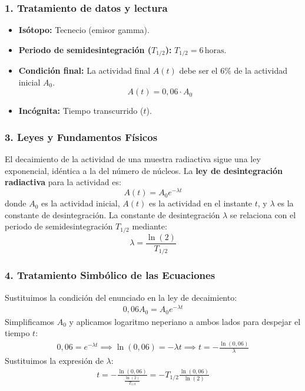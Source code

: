 \subsubsection*{1. Tratamiento de datos y lectura}
\begin{itemize}
    \item \textbf{Isótopo:} Tecnecio (emisor gamma).
    \item \textbf{Periodo de semidesintegración ($T_{1/2}$):} $T_{1/2} = 6\,\text{horas}$.
    \item \textbf{Condición final:} La actividad final $A(t)$ debe ser el 6\% de la actividad inicial $A_0$.
    $$ A(t) = 0,06 \cdot A_0 $$
    \item \textbf{Incógnita:} Tiempo transcurrido ($t$).
\end{itemize}

\subsubsection*{3. Leyes y Fundamentos Físicos}
El decaimiento de la actividad de una muestra radiactiva sigue una ley exponencial, idéntica a la del número de núcleos.
La \textbf{ley de desintegración radiactiva} para la actividad es:
$$ A(t) = A_0 e^{-\lambda t} $$
donde $A_0$ es la actividad inicial, $A(t)$ es la actividad en el instante $t$, y $\lambda$ es la constante de desintegración.
La constante de desintegración $\lambda$ se relaciona con el periodo de semidesintegración $T_{1/2}$ mediante:
$$ \lambda = \frac{\ln(2)}{T_{1/2}} $$

\subsubsection*{4. Tratamiento Simbólico de las Ecuaciones}
Sustituimos la condición del enunciado en la ley de decaimiento:
\begin{gather}
    0,06 A_0 = A_0 e^{-\lambda t}
\end{gather}
Simplificamos $A_0$ y aplicamos logaritmo neperiano a ambos lados para despejar el tiempo $t$:
\begin{gather}
    0,06 = e^{-\lambda t} \implies \ln(0,06) = -\lambda t \implies t = -\frac{\ln(0,06)}{\lambda}
\end{gather}
Sustituimos la expresión de $\lambda$:
\begin{gather}
    t = -\frac{\ln(0,06)}{\frac{\ln(2)}{T_{1/2}}} = -T_{1/2} \frac{\ln(0,06)}{\ln(2)}
\end{gather}

